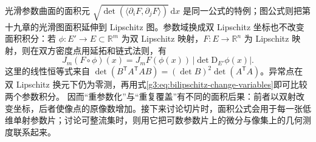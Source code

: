 光滑参数曲面的面积元 \(\sqrt{\det(\langle\partial_iF,\partial_jF\rangle)}\,\mathrm dx\) 是同一公式的特例；图公式则把第十九章的光滑图面积延伸到 Lipschitz 图。参数域换成双 Lipschitz 坐标也不改变面积积分：若 \(\phi:E'\to E\subset\mathbb R^m\) 为双 Lipschitz 映射，\(F:E\to\mathbb R^n\) 为 Lipschitz 映射，则在双方密度点用延拓和链式法则，有
\[
	J_m(F\circ\phi)(x)
	=J_mF(\phi(x))\,|\det\mathrm D_{E'}\phi(x)|.
\]
这里的线性恒等式来自
\(\det(B^{\mathsf T}A^{\mathsf T}AB)=(\det B)^2\det(A^{\mathsf T}A)\)。异常点在双 Lipschitz 换元下仍为零测，再用式\eqref{g3:eq:bilipschitz-change-variables}即可比较两个参数积分。
\ProseParagraphBreak
因而“重参数化”与“重复覆盖”有不同的面积后果：前者以双射改变坐标，后者使像点的原像数增加。接下来讨论切片时，面积公式会用于每一张低维单射参数片；讨论可整流集时，则用它把可数参数片上的微分与像集上的几何测度联系起来。
